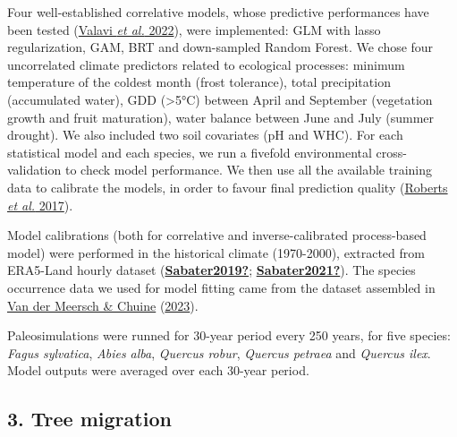 \documentclass[11pt,]{article}
\begin{document}
Four well-established correlative models, whose predictive performances
have been tested (\protect\hyperlink{ref-Valavi2022}{Valavi \emph{et
al.} 2022}), were implemented: GLM with lasso regularization, GAM, BRT
and down-sampled Random Forest. We chose four uncorrelated climate
predictors related to ecological processes: minimum temperature of the
coldest month (frost tolerance), total precipitation (accumulated
water), GDD (\textgreater5°C) between April and September (vegetation
growth and fruit maturation), water balance between June and July
(summer drought). We also included two soil covariates (pH and WHC). For
each statistical model and each species, we run a fivefold environmental
cross-validation to check model performance. We then use all the
available training data to calibrate the models, in order to favour
final prediction quality (\protect\hyperlink{ref-Roberts2017}{Roberts
\emph{et al.} 2017}).

Model calibrations (both for correlative and inverse-calibrated
process-based model) were performed in the historical climate
(1970-2000), extracted from ERA5-Land hourly dataset
(\protect\hyperlink{ref-Sabater2019}{\textbf{Sabater2019?}};
\protect\hyperlink{ref-Sabater2021}{\textbf{Sabater2021?}}). The species
occurrence data we used for model fitting came from the dataset
assembled in \protect\hyperlink{ref-VanderMeersch2023}{Van der Meersch
\& Chuine} (\protect\hyperlink{ref-VanderMeersch2023}{2023}).

Paleosimulations were runned for 30-year period every 250 years, for
five species: \emph{Fagus sylvatica}, \emph{Abies alba}, \emph{Quercus
robur}, \emph{Quercus petraea} and \emph{Quercus ilex}. Model outputs
were averaged over each 30-year period.

\hypertarget{tree-migration}{%
\subsection{3. Tree migration}\label{tree-migration}}
\end{document}
